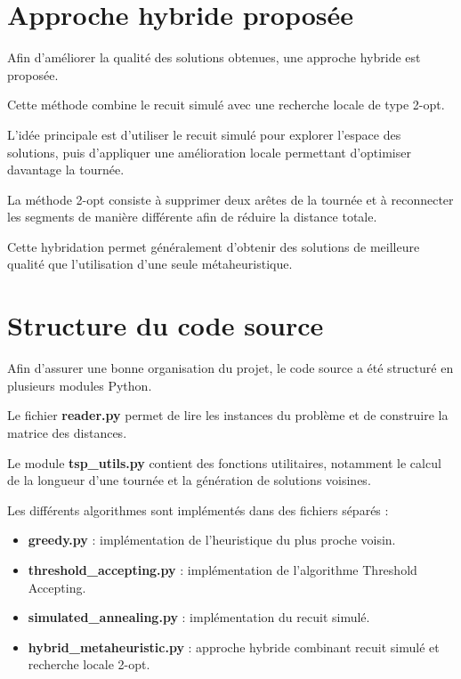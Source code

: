 \documentclass[11pt,a4paper]{article}
\begin{document}
	\section{Approche hybride proposée}
	
	Afin d'améliorer la qualité des solutions obtenues, une approche hybride est proposée.
	
	Cette méthode combine le recuit simulé avec une recherche locale de type 2-opt.
	
	L'idée principale est d'utiliser le recuit simulé pour explorer l'espace des solutions, puis d'appliquer une amélioration locale permettant d'optimiser davantage la tournée.
	
	La méthode 2-opt consiste à supprimer deux arêtes de la tournée et à reconnecter les segments de manière différente afin de réduire la distance totale.
	
	Cette hybridation permet généralement d'obtenir des solutions de meilleure qualité que l'utilisation d'une seule métaheuristique.
	
	\section{Structure du code source}
	
	Afin d'assurer une bonne organisation du projet, le code source a été
	structuré en plusieurs modules Python.
	
	Le fichier \textbf{reader.py} permet de lire les instances du problème
	et de construire la matrice des distances.
	
	Le module \textbf{tsp\_utils.py} contient des fonctions utilitaires,
	notamment le calcul de la longueur d'une tournée et la génération
	de solutions voisines.
	
	Les différents algorithmes sont implémentés dans des fichiers séparés :
	
	\begin{itemize}
		\item \textbf{greedy.py} : implémentation de l'heuristique du plus proche voisin.
		\item \textbf{threshold\_accepting.py} : implémentation de l'algorithme Threshold Accepting.
		\item \textbf{simulated\_annealing.py} : implémentation du recuit simulé.
		\item \textbf{hybrid\_metaheuristic.py} : approche hybride combinant recuit simulé et recherche locale 2-opt.
	\end{itemize}
	
\end{document}
